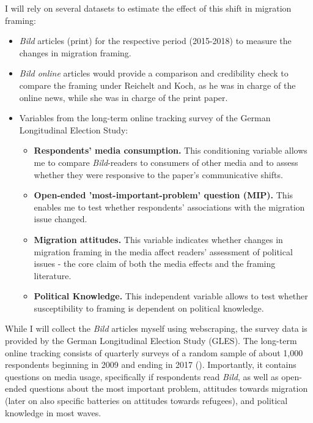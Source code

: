 \documentclass{article}
\begin{document}
I will rely on several datasets to estimate the effect of this shift in migration framing:
\begin{itemize}
    \item \textit{Bild} articles (print) for the respective period (2015-2018) to measure the changes in migration framing.
    \item \textit{Bild online} articles would provide a comparison and credibility check to compare the framing under Reichelt and Koch, as he was in charge of the online news, while she was in charge of the print paper.
    \item Variables from the long-term online tracking survey of the German Longitudinal Election Study:
    \begin{itemize}
        \item \textbf{Respondents' media consumption.} This conditioning variable allows me to compare \textit{Bild}-readers to consumers of other media and to assess whether they were responsive to the paper's communicative shifts.
        \item \textbf{Open-ended 'most-important-problem' question (MIP).} This enables me to test whether respondents' associations with the migration issue changed.
        \item \textbf{Migration attitudes.} This variable indicates whether changes in migration framing in the media affect readers' assessment of political issues - the core claim of both the media effects and the framing literature.
        \item \textbf{Political Knowledge.} This independent variable allows to test whether susceptibility to framing is dependent on political knowledge.
    \end{itemize}
\end{itemize}

While I will collect the \textit{Bild} articles myself using webscraping, the survey data is provided by the German Longitudinal Election Study (GLES). The long-term online tracking consists of quarterly surveys of a random sample of about 1,000 respondents beginning in 2009 and ending in 2017 (\cite{GLES2019LongTermTracking}). Importantly, it contains questions on media usage, specifically if respondents read \textit{Bild}, as well as open-ended questions about the most important problem, attitudes towards migration (later on also specific batteries on attitudes towards refugees), and political knowledge in most waves.
\end{document}
